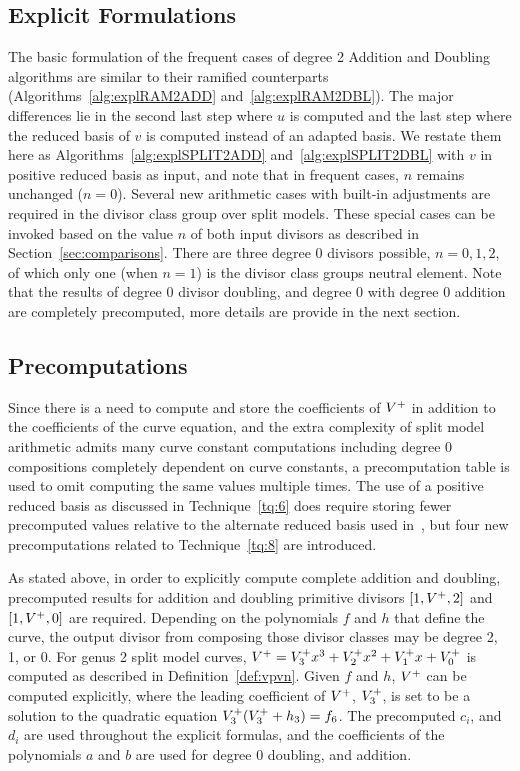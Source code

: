 \subsection{Explicit Formulations}
The basic formulation of the frequent cases of degree 2 Addition and Doubling
algorithms are similar to their ramified counterparts
(Algorithms~\ref{alg:explRAM2ADD} and~\ref{alg:explRAM2DBL}). The major
differences lie in the second last step where $u$ is computed and the last step
where the reduced basis of $v$ is computed instead of an adapted basis. We
restate them here as Algorithms~\ref{alg:explSPLIT2ADD}
and~\ref{alg:explSPLIT2DBL} with  $v$ in positive reduced basis as input, and
note that in frequent cases, $n$ remains unchanged ($n = 0$). Several new
arithmetic cases with built-in adjustments are required in the divisor class
group over split models. These special cases can be invoked based on the
value $n$ of both input divisors as described in Section~\ref{sec:comparisons}.
There are three degree 0 divisors possible, $n=0,1,2$, of which only one (when
$n=1$) is the divisor class groups neutral element. Note that the results of
degree 0 divisor doubling, and degree 0 with degree 0 addition are completely
precomputed, more details are provide in the next section.

\subsection{Precomputations}
Since there is a need to compute and store the coefficients of $V^{+}$ in addition
to the coefficients of the curve equation, and the extra
complexity of split model arithmetic admits many curve constant computations
including degree 0 compositions completely dependent on curve constants, a
precomputation table is used to omit computing the same values multiple times.
The use of a positive reduced basis as discussed in Technique~\ref{tq:6} does
require storing fewer precomputed values relative to the alternate reduced basis
used in~\cite[Table~1]{EricksonJacobsonStein_realg2_2011}, but four new
precomputations related to Technique~\ref{tq:8} are introduced.

As stated above, in order to explicitly compute complete addition and doubling,
precomputed results for addition and doubling primitive divisors $[1,V^{+},2]$ and
$[1,V^{+},0]$ are required. Depending on the polynomials $f$ and $h$ that define
the curve, the output divisor from composing those divisor classes may be degree
2, 1, or 0. For genus 2 split model curves, $V^{+} = V^{+}_3x^3 + V^{+}_2x^2 + V^{+}_1x
+ V^{+}_0$ is computed as described in Definition~\ref{def:vpvn}. Given $f$ and
$h$, $V^{+}$ can be computed explicitly, where the leading coefficient of $V^{+}$,
$V^{+}_3$, is set to be a solution to the quadratic equation $V^{+}_3(V^{+}_3 + h_3) =
f_6$. The precomputed $c_i$, and $d_i$ are used throughout the explicit
formulas, and the coefficients of the polynomials $a$ and $b$ are used for
degree 0 doubling, and addition.


